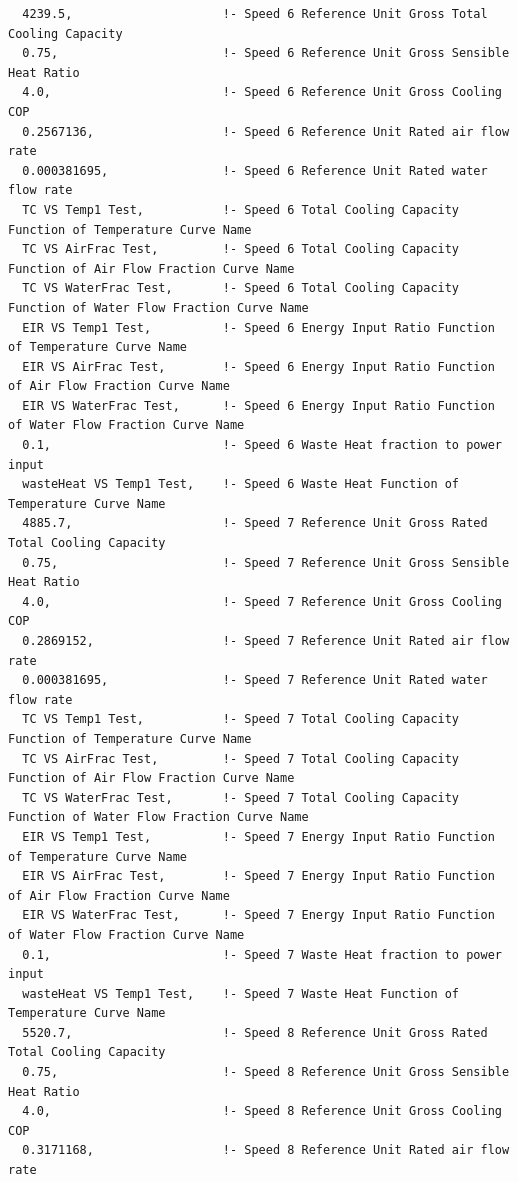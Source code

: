 \begin{lstlisting}
  4239.5,                     !- Speed 6 Reference Unit Gross Total Cooling Capacity
  0.75,                       !- Speed 6 Reference Unit Gross Sensible Heat Ratio
  4.0,                        !- Speed 6 Reference Unit Gross Cooling COP
  0.2567136,                  !- Speed 6 Reference Unit Rated air flow rate
  0.000381695,                !- Speed 6 Reference Unit Rated water flow rate
  TC VS Temp1 Test,           !- Speed 6 Total Cooling Capacity Function of Temperature Curve Name
  TC VS AirFrac Test,         !- Speed 6 Total Cooling Capacity Function of Air Flow Fraction Curve Name
  TC VS WaterFrac Test,       !- Speed 6 Total Cooling Capacity Function of Water Flow Fraction Curve Name
  EIR VS Temp1 Test,          !- Speed 6 Energy Input Ratio Function of Temperature Curve Name
  EIR VS AirFrac Test,        !- Speed 6 Energy Input Ratio Function of Air Flow Fraction Curve Name
  EIR VS WaterFrac Test,      !- Speed 6 Energy Input Ratio Function of Water Flow Fraction Curve Name
  0.1,                        !- Speed 6 Waste Heat fraction to power input
  wasteHeat VS Temp1 Test,    !- Speed 6 Waste Heat Function of Temperature Curve Name
  4885.7,                     !- Speed 7 Reference Unit Gross Rated Total Cooling Capacity
  0.75,                       !- Speed 7 Reference Unit Gross Sensible Heat Ratio
  4.0,                        !- Speed 7 Reference Unit Gross Cooling COP
  0.2869152,                  !- Speed 7 Reference Unit Rated air flow rate
  0.000381695,                !- Speed 7 Reference Unit Rated water flow rate
  TC VS Temp1 Test,           !- Speed 7 Total Cooling Capacity Function of Temperature Curve Name
  TC VS AirFrac Test,         !- Speed 7 Total Cooling Capacity Function of Air Flow Fraction Curve Name
  TC VS WaterFrac Test,       !- Speed 7 Total Cooling Capacity Function of Water Flow Fraction Curve Name
  EIR VS Temp1 Test,          !- Speed 7 Energy Input Ratio Function of Temperature Curve Name
  EIR VS AirFrac Test,        !- Speed 7 Energy Input Ratio Function of Air Flow Fraction Curve Name
  EIR VS WaterFrac Test,      !- Speed 7 Energy Input Ratio Function of Water Flow Fraction Curve Name
  0.1,                        !- Speed 7 Waste Heat fraction to power input
  wasteHeat VS Temp1 Test,    !- Speed 7 Waste Heat Function of Temperature Curve Name
  5520.7,                     !- Speed 8 Reference Unit Gross Rated Total Cooling Capacity
  0.75,                       !- Speed 8 Reference Unit Gross Sensible Heat Ratio
  4.0,                        !- Speed 8 Reference Unit Gross Cooling COP
  0.3171168,                  !- Speed 8 Reference Unit Rated air flow rate

\end{lstlisting}
